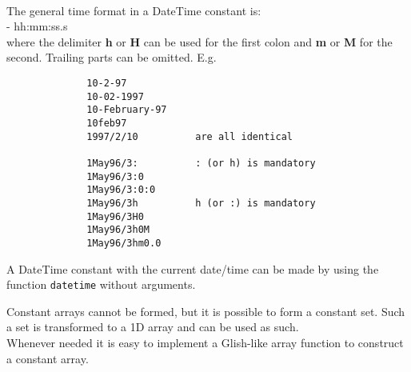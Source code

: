\begin{itemize}
\begin{enumerate}
              \\The general time format in a DateTime constant is:
              \\- hh:mm:ss.s
              \\where the delimiter \textbf{h} or \textbf{H} can be used
              for the first colon and \textbf{m} or \textbf{M} for the second.
              Trailing parts can be omitted. E.g.
              \begin{verbatim}
              10-2-97
              10-02-1997
              10-February-97
              10feb97
              1997/2/10          are all identical

              1May96/3:          : (or h) is mandatory
              1May96/3:0
              1May96/3:0:0
              1May96/3h          h (or :) is mandatory
              1May96/3H0
              1May96/3h0M
              1May96/3hm0.0
              \end{verbatim}
              A DateTime constant with the current date/time can be made
              by using the function \texttt{datetime} without arguments.
       \end{enumerate}
\end{itemize}
Constant arrays cannot be formed, but it is possible to form a
constant set. Such a set is transformed to a 1D array and can be used
as such.
\\Whenever needed it is easy to implement a Glish-like array function
to construct a constant array.

